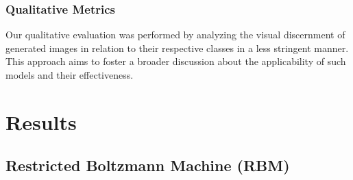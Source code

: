 \documentclass[%
 reprint,
 amsmath,amssymb,
 aps,
]{revtex4-2}
\begin{document}
\subsubsection{Qualitative Metrics}
Our qualitative evaluation was performed by analyzing the visual discernment of generated images in relation to their respective classes in a less stringent manner. This approach aims to foster a broader discussion about the applicability of such models and their effectiveness.

\section{Results}
\subsection{Restricted Boltzmann Machine (RBM)}
\end{document}

